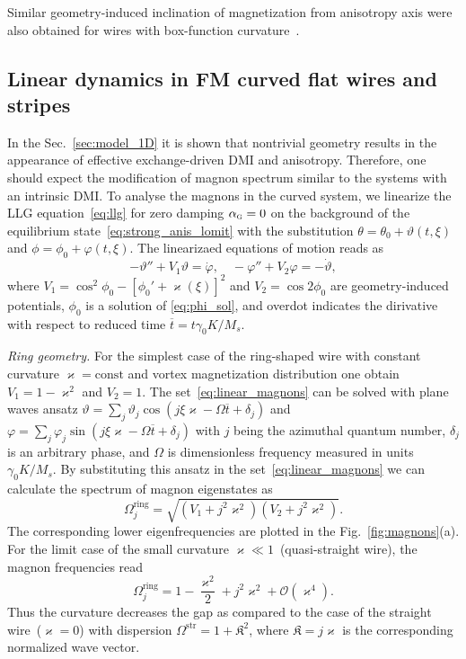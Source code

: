 Similar geometry-induced inclination of magnetization from anisotropy axis were also obtained for wires with box-function curvature~\cite{Gaididei18a}.


\subsection{Linear dynamics in FM curved flat wires and stripes}\label{sec:linear_dyn}

In the Sec.~\ref{sec:model_1D} it is shown that nontrivial geometry results in the appearance of effective exchange-driven DMI and anisotropy. Therefore, one should expect the modification of magnon spectrum similar to the systems with an intrinsic DMI. To analyse the magnons in the curved system, we linearize the LLG equation~\eqref{eq:llg} for zero damping $\alpha_\textsc{g}=0$ on the background of the equilibrium state~\eqref{eq:strong_anis_lomit} with the substitution $\theta=\theta_0+\vartheta(t,\xi)$ and $\phi=\phi_0+\varphi(t,\xi)$. The linearizaed equations of motion reads as~\cite{Sheka15,Gaididei18a,Korniienko19b}
\begin{equation}\label{eq:linear_magnons}
-\vartheta''+V_1\vartheta = \dot{\varphi},\quad  -\varphi''+V_2\varphi = -\dot{\vartheta},
\end{equation}
where $V_1 = \cos^2\phi_0 - \left[\phi_0'+\varkappa(\xi)\right]^2$ and $V_2 = \cos2\phi_0$ are geometry-induced potentials, $\phi_0$ is a solution of \eqref{eq:phi_sol}, and overdot indicates the dirivative with respect to reduced time $\overline{t}=t\gamma_0K/M_s$.

{\it Ring geometry.} For the simplest case of the ring-shaped wire with constant curvature $\varkappa=\text{const}$ and vortex magnetization distribution one obtain $V_1=1-\varkappa^2$ and $V_2=1$. The set~\eqref{eq:linear_magnons} can be solved with plane waves ansatz $\vartheta=\sum_j \vartheta_j \cos(j\xi\varkappa-\Omega\overline{t}+\delta_j)$ and $\varphi=\sum_j \varphi_j \sin(j\xi\varkappa-\Omega\overline{t}+\delta_j)$ with $j$ being the azimuthal quantum number, $\delta_j$ is an arbitrary phase, and $\Omega$ is dimensionless frequency measured in units $\gamma_0K/M_s$. By substituting this ansatz in the set~\eqref{eq:linear_magnons} we can calculate the spectrum of magnon eigenstates as
\begin{equation}\label{eq:spec_rings}
\Omega^\text{ring}_j = \sqrt{\left(V_1+j^2\varkappa^2\right)\left(V_2+j^2\varkappa^2\right)}.
\end{equation}
The corresponding lower eigenfrequencies are plotted in the Fig.~\ref{fig:magnons}(a). For the limit case of the small curvature $\varkappa\ll1$~(quasi-straight wire), the magnon frequencies read
\begin{equation}\label{eq:spec_rings_small}
\Omega^\text{ring}_j = 1- \frac{\varkappa^2}{2}+j^2\varkappa^2+\mathcal{O}(\varkappa^4).
\end{equation}
Thus the curvature decreases the gap as compared to the case of the straight wire~($\varkappa=0$) with dispersion $\Omega^\text{str} = 1 + \mathfrak{K}^2$, where $\mathfrak{K}=j\varkappa$ is the corresponding normalized wave vector.

